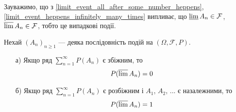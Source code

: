 Зауважимо, що з \ref{limit_event_all_after_some_number_heppens},
\ref{limit_event_heppens_infinitely_many_times} випливає, що 
$\varliminf A_n \in \mathcal{F}$, $\varlimsup A_n \in \mathcal{F}$,
тобто це випадкові події.

\begin{lemma}
    Нехай $(A_n)_{n \geqslant 1}$ --- деяка послідовність
    подій на $(\Omega, \mathcal{F}, P)$.
    \begin{itemize}
        \item[а)] Якщо ряд $\sum\limits_{n=1}^{\infty} P(A_n)$ є збіжним, то
            \begin{equation}
                P(\varlimsup A_n) = 0
            \end{equation}
        
        \item[б)] Якщо ряд $\sum\limits_{n=1}^{\infty} P(A_n)$ є розбіжним
            і $A_1$, $A_2$, ... є назалежними, то 
            \begin{equation}
                P(\varlimsup A_n) = 1
            \end{equation}
    \end{itemize}
\end{lemma}
